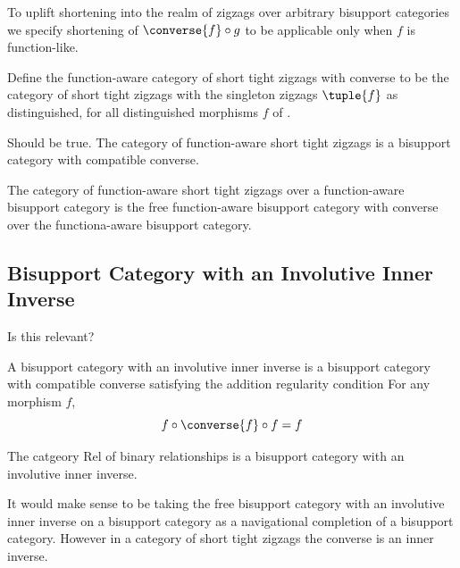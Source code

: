 \begin{aside}
To uplift shortening into the realm of zigzags over arbitrary bisupport
categories we specify shortening of $\converse{f} \circ g$ to be applicable only when $f$ is function-like.
\end{aside}

Define the function-aware category of short tight zigzags with 
converse to be the category of short tight zigzags with the
singleton zigzags $\tuple{f}$ as distinguished, for all distinguished morphisms $f$ of \catd.  

\begin{lemma}{Should be true.}
The category of function-aware short tight zigzags is a bisupport category with compatible converse.
\end{lemma}

\begin{lemma}
The category of function-aware short tight zigzags over a 
function-aware bisupport category \catcw is the 
free function-aware bisupport category with converse over 
the functiona-aware bisupport category\catc. 
\end{lemma}

\begin{aside}
\end{aside}

\subsection{Bisupport Category with an Involutive Inner Inverse}
\begin{aside}
Is this relevant?
\end{aside}

\begin{definition}
A bisupport category with an involutive inner inverse 
is a bisupport category with compatible converse satisfying the addition 
regularity condition
\noindent [K.4]\quad
For any morphism $f$,
\[
f \circ \converse{f} \circ f =f
\]
\end{definition}

\begin{aside}
The catgeory Rel of binary relationships is a 
bisupport category with an involutive inner inverse.

It would make sense to be taking the free 
bisupport category with an involutive inner inverse on a bisupport category
as a navigational completion of a bisupport category.
However in a category of short tight zigzags the converse is  an inner inverse.
\end{aside}




